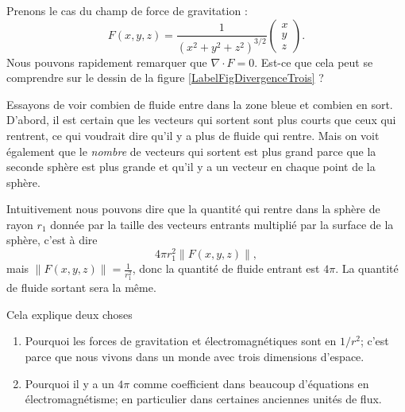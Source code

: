 \begin{example}
    Prenons le cas du champ de force de gravitation :
    \begin{equation}
        F(x,y,z)=\frac{1}{ (x^2+y^2+z^2)^{3/2} }\begin{pmatrix}
            x    \\ 
            y   \\
            z
        \end{pmatrix}.
    \end{equation}
    Nous pouvons rapidement remarquer que $\nabla\cdot F=0$. Est-ce que cela peut se comprendre sur le dessin de la figure \ref{LabelFigDivergenceTrois} ?
    \newcommand{\CaptionFigDivergenceTrois}{Le champ de vecteur de la gravité. Nous avons tracé, sur les deux cercles la même densité de vecteurs, c'est à dire le même nombre de vecteurs par unité de surface.}
    

    Essayons de voir combien de fluide entre dans la zone bleue et combien en sort. D'abord, il est certain que les vecteurs qui sortent sont plus courts que ceux qui rentrent, ce qui voudrait dire qu'il y a plus de fluide qui rentre. Mais on voit également que le \emph{nombre} de vecteurs qui sortent est plus grand parce que la seconde sphère est plus grande et qu'il y a un vecteur en chaque point de la sphère.

    Intuitivement nous pouvons dire que la quantité qui rentre dans la sphère de rayon $r_1$ donnée par la taille des vecteurs entrants multiplié par la surface de la sphère, c'est à dire
    \begin{equation}        \label{EqQpinormeVecto}
        4\pi r_1^2\| F(x,y,z) \|,
    \end{equation}
    mais $\| F(x,y,z) \|=\frac{1}{ r_1^2 }$, donc la quantité de fluide entrant est $4\pi$. La quantité de fluide sortant sera la même.

    Cela explique deux choses
    \begin{enumerate}
        \item
            Pourquoi les forces de gravitation et électromagnétiques sont en $1/r^2$; c'est parce que nous vivons dans un monde avec trois dimensions d'espace.
        \item
            Pourquoi il y a un $4\pi$ comme coefficient dans beaucoup d'équations en électromagnétisme; en particulier dans certaines anciennes unités de flux.
    \end{enumerate}
    
\end{example}

